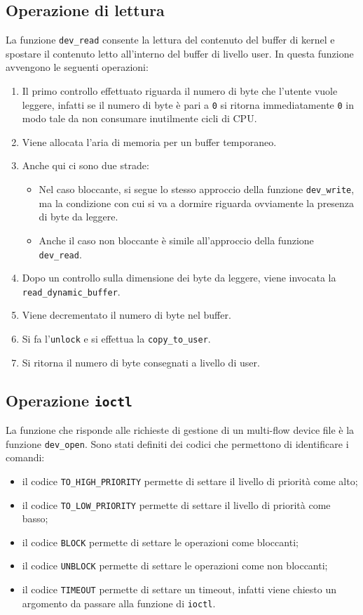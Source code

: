 \documentclass[oneside]{article}
\begin{document}
\subsection{Operazione di lettura}
La funzione \texttt{dev\_read} consente la lettura del contenuto del buffer di kernel e spostare il contenuto letto all'interno del buffer di livello user. In questa funzione avvengono le seguenti operazioni:
\begin{enumerate}
\item Il primo controllo effettuato riguarda il numero di byte che l'utente vuole leggere, infatti se il numero di byte è pari a \texttt{0} si ritorna immediatamente \texttt{0} in modo tale da non consumare inutilmente cicli di CPU.
\item Viene allocata l'aria di memoria per un buffer temporaneo.
\item Anche qui ci sono due strade:
\begin{itemize}
\item Nel caso bloccante, si segue lo stesso approccio della funzione \texttt{dev\_write}, ma la condizione con cui si va a dormire riguarda ovviamente la presenza di byte da leggere.
\item Anche il caso non bloccante è simile all'approccio della funzione \texttt{dev\_read}.
\end{itemize}
\item Dopo un controllo sulla dimensione dei byte da leggere, viene invocata la \texttt{read\_dynamic\_buffer}.
\item Viene decrementato il numero di byte nel buffer.
\item Si fa l'\texttt{unlock} e si effettua la \texttt{copy\_to\_user}.
\item Si ritorna il numero di byte consegnati a livello di user.
\end{enumerate}

\subsection{Operazione \texttt{ioctl}}
La funzione che risponde alle richieste di gestione di un multi-flow device file è la funzione \texttt{dev\_open}. Sono stati definiti dei codici che permettono di identificare i comandi:
\begin{itemize}
\item il codice \texttt{TO\_HIGH\_PRIORITY} permette di settare il livello di priorità come alto;
\item il codice \texttt{TO\_LOW\_PRIORITY} permette di settare il livello di priorità come basso;
\item il codice \texttt{BLOCK} permette di settare le operazioni come bloccanti;
\item il codice \texttt{UNBLOCK} permette di settare le operazioni come non bloccanti;
\item il codice \texttt{TIMEOUT} permette di settare un timeout, infatti viene chiesto un argomento da passare alla funzione di \texttt{ioctl}.
\end{itemize}
\end{document}
